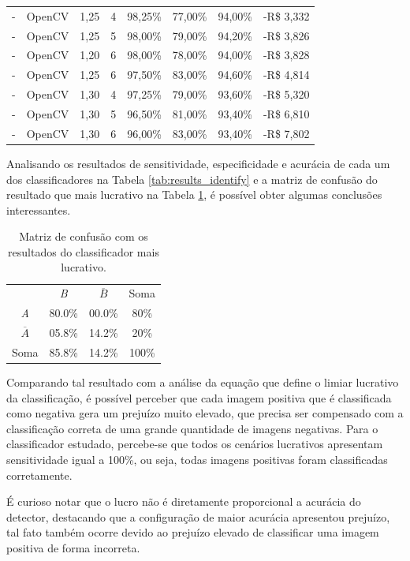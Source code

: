\begin{table}[htbp]
\begin{tabular}{clrrrrrr}
        -     & OpenCV & 1,25 & 4  & 98,25\%       & 77,00\%        & 94,00\%  & -R\$ 3,332 \\
        -     & OpenCV & 1,25 & 5  & 98,00\%       & 79,00\%        & 94,20\%  & -R\$ 3,826 \\
        -     & OpenCV & 1,20 & 6  & 98,00\%       & 78,00\%        & 94,00\%  & -R\$ 3,828 \\
        -     & OpenCV & 1,25 & 6  & 97,50\%       & 83,00\%        & 94,60\%  & -R\$ 4,814 \\
        -     & OpenCV & 1,30 & 4  & 97,25\%       & 79,00\%        & 93,60\%  & -R\$ 5,320 \\
        -     & OpenCV & 1,30 & 5  & 96,50\%       & 81,00\%        & 93,40\%  & -R\$ 6,810 \\
        -     & OpenCV & 1,30 & 6  & 96,00\%       & 83,00\%        & 93,40\%  & -R\$ 7,802 \\
    \end{tabular}
\end{table}

Analisando os resultados de sensitividade, especificidade e acurácia de cada um dos classificadores na Tabela \ref{tab:results_identify} e a matriz de confusão do resultado que mais lucrativo na Tabela \ref{tab:matriz_de_confusao_best_result}, é possível obter algumas conclusões interessantes.

\begin{table}[htbp]
    \caption{Matriz de confusão com os resultados do classificador mais lucrativo.}
    \label{tab:matriz_de_confusao_best_result}
    \centering
    \begin{tabular}{cccc}\hline\hline
                       & \textit{B} & $\overline{B}$ & Soma  \\
        \textit{A}     & 80.0\%     & 00.0\%         & 80\%  \\
        $\overline{A}$ & 05.8\%     & 14.2\%         & 20\%  \\
        Soma           & 85.8\%     & 14.2\%         & 100\% \\
        \hline\hline
    \end{tabular}
\end{table}

Comparando tal resultado com a análise da equação que define o limiar lucrativo da classificação, é possível perceber que cada imagem positiva que é classificada como negativa gera um prejuízo muito elevado, que precisa ser compensado com a classificação correta de uma grande quantidade de imagens negativas. Para o classificador estudado, percebe-se que todos os cenários lucrativos apresentam sensitividade igual a 100\%, ou seja, todas imagens positivas foram classificadas corretamente.

É curioso notar que o lucro não é diretamente proporcional a acurácia do detector, destacando que a configuração de maior acurácia apresentou prejuízo, tal fato também ocorre devido ao prejuízo elevado de classificar uma imagem positiva de forma incorreta.